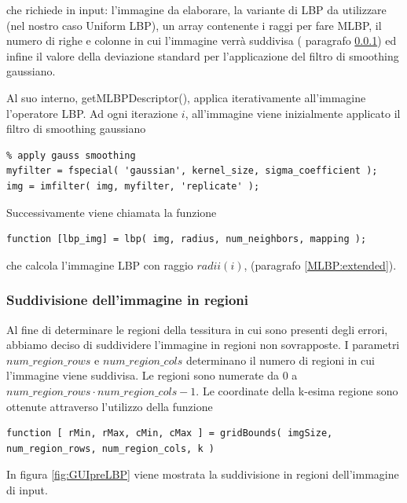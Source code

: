 che richiede in input: l'immagine da elaborare, la variante di \acs{LBP} da utilizzare (nel nostro caso Uniform LBP), un array contenente i raggi per fare \acs{MLBP}, il numero di righe e colonne in cui l'immagine verrà suddivisa ( paragrafo \ref{imp:seg}) ed infine il valore della deviazione standard per l'applicazione del filtro di smoothing gaussiano.

Al suo interno, getMLBPDescriptor(), applica iterativamente all'immagine l'operatore \acs{LBP}.
Ad ogni iterazione $i$, all'immagine viene inizialmente applicato il filtro di smoothing gaussiano

\begin{lstlisting}
% apply gauss smoothing
myfilter = fspecial( 'gaussian', kernel_size, sigma_coefficient );
img = imfilter( img, myfilter, 'replicate' );
\end{lstlisting}

\noindent Successivamente viene chiamata la funzione\cite{lbpcode}

\begin{lstlisting}
function [lbp_img] = lbp( img, radius, num_neighbors, mapping );
\end{lstlisting}

\noindent che calcola l'immagine \acs{LBP} con raggio $radii(i)$, (paragrafo \ref{MLBP:extended}).

\subsubsection{Suddivisione dell'immagine in regioni}
\label{imp:seg}
Al fine di determinare le regioni della tessitura in cui sono presenti degli errori, abbiamo deciso di suddividere l'immagine in regioni non sovrapposte. I parametri $num\_region\_rows$ e $num\_region\_cols$ determinano il numero di regioni in cui l'immagine viene suddivisa.
Le regioni sono numerate da $0$ a $num\_region\_rows \cdot num\_region\_cols - 1$.
Le coordinate della k-esima regione sono ottenute attraverso l'utilizzo della funzione

\begin{lstlisting}
function [ rMin, rMax, cMin, cMax ] = gridBounds( imgSize, num_region_rows, num_region_cols, k )
\end{lstlisting}

In figura \ref{fig:GUIpreLBP} viene mostrata la suddivisione in regioni dell'immagine di input. \\


